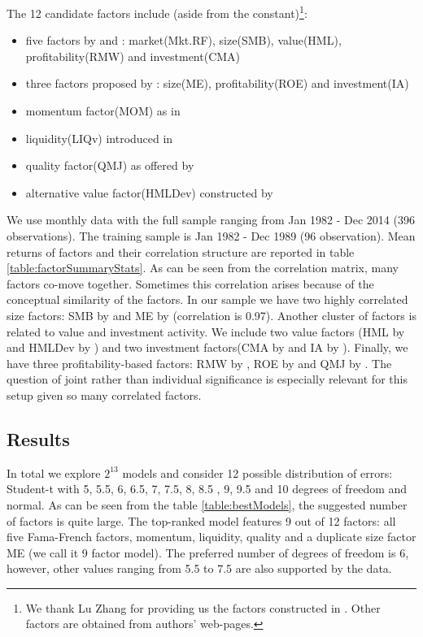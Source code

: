 The 12 candidate factors include (aside from the constant)\footnote{We thank Lu Zhang for providing us the factors constructed in \cite{hou2014digesting}.
Other factors are obtained from authors' web-pages.}:
\begin{itemize}
	\item five factors by \cite{fama1993common} and \cite{fama2015five}: market(Mkt.RF), size(SMB), value(HML), profitability(RMW) and investment(CMA)
	\item three factors proposed by \cite{hou2014digesting}: size(ME), profitability(ROE) and investment(IA)
	\item momentum factor(MOM) as in \cite{carhart1997persistence}
	\item liquidity(LIQv) introduced in \cite{stambaugh2003liquidity}
	\item quality factor(QMJ) as offered by \cite{asness2014quality}
	\item alternative value factor(HMLDev) constructed by \cite{asness2013devil}
\end{itemize}
We use monthly data with the full sample ranging from Jan 1982 - Dec 2014 (396 observations). The training sample is Jan 1982 - Dec 1989 (96 observation). 
Mean returns of factors and their correlation structure are reported in table \ref{table:factorSummaryStats}.
As can be seen from the correlation matrix, many factors co-move together. 
Sometimes this correlation arises because of the conceptual similarity of the factors. 
In our sample we have two highly correlated size factors: SMB by \cite{fama2015five} and ME by \cite{hou2014digesting} (correlation is 0.97). 
Another cluster of factors is related to value and investment activity. 
We include two value factors (HML by \cite{fama2015five} and HMLDev by \cite{asness2013devil}) and two investment factors(CMA by \cite{fama2015five} and IA by \cite{hou2014digesting}). 
Finally, we have three profitability-based factors: RMW by \cite{fama2015five}, ROE by \cite{hou2014digesting} and QMJ by \cite{asness2014quality}.  
The question of joint rather than individual significance is especially relevant for this setup given so many correlated factors. 

\subsection{Results}
In total we explore $2^{13}$ models and consider 12 possible distribution of errors: Student-t with 5, 5.5, 6, 6.5, 7, 7.5, 8, 8.5 , 9, 9.5 and 10 degrees of freedom and normal. 
As can be seen from the table \ref{table:bestModels}, the suggested number of factors is quite large. 
The top-ranked model features 9 out of 12 factors: all five Fama-French factors, momentum, liquidity, quality and a duplicate size factor ME (we call it 9 factor model).
The preferred number of degrees of freedom is 6, however, other values ranging from 5.5 to 7.5 are also supported by the data.

